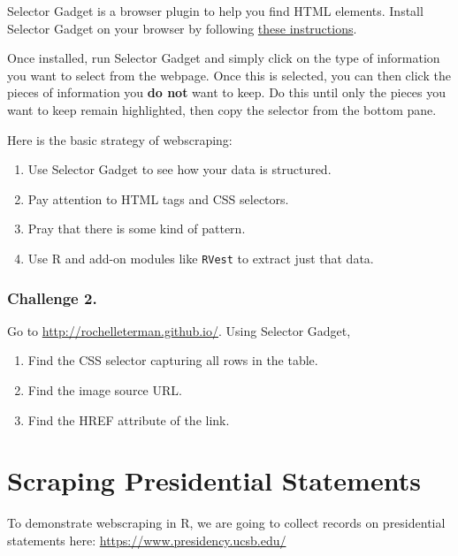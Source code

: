 \documentclass[
]{book}
\providecommand{\tightlist}{%
  \setlength{\itemsep}{0pt}\setlength{\parskip}{0pt}}
\begin{document}
Selector Gadget is a browser plugin to help you find HTML elements. Install Selector Gadget on your browser by following \href{https://selectorgadget.com/}{these instructions}.

Once installed, run Selector Gadget and simply click on the type of information you want to select from the webpage. Once this is selected, you can then click the pieces of information you \textbf{do not} want to keep. Do this until only the pieces you want to keep remain highlighted, then copy the selector from the bottom pane.

Here is the basic strategy of webscraping:

\begin{enumerate}
\def\labelenumi{\arabic{enumi}.}
\tightlist
\item
  Use Selector Gadget to see how your data is structured.
\item
  Pay attention to HTML tags and CSS selectors.
\item
  Pray that there is some kind of pattern.
\item
  Use R and add-on modules like \texttt{RVest} to extract just that data.
\end{enumerate}

\hypertarget{challenge-2.-15}{%
\subsubsection*{Challenge 2.}\label{challenge-2.-15}}

Go to \url{http://rochelleterman.github.io/}. Using Selector Gadget,

\begin{enumerate}
\def\labelenumi{\arabic{enumi}.}
\tightlist
\item
  Find the CSS selector capturing all rows in the table.
\item
  Find the image source URL.
\item
  Find the HREF attribute of the link.
\end{enumerate}

\hypertarget{scraping-presidential-statements}{%
\section{Scraping Presidential Statements}\label{scraping-presidential-statements}}

To demonstrate webscraping in R, we are going to collect records on presidential statements here: \url{https://www.presidency.ucsb.edu/}
\end{document}
